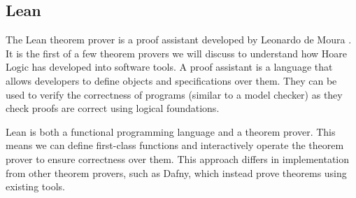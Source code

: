 \subsection{Lean}
The Lean theorem prover is a proof assistant developed by Leonardo de Moura \cite{lean}. It is the first of a few theorem provers we will discuss to understand how Hoare Logic has developed into software tools. A proof assistant is a language that allows developers to define objects and specifications over them. They can be used to verify the correctness of programs (similar to a model checker) as they check proofs are correct using logical foundations.
\par
Lean is both a functional programming language and a theorem prover. This means we can define first-class functions and interactively operate the theorem prover to ensure correctness over them. This approach differs in implementation from other theorem provers, such as Dafny, which instead prove theorems using existing tools.

